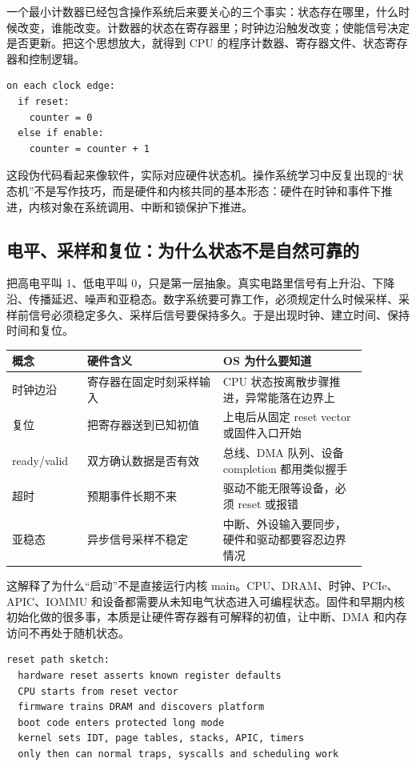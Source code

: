 一个最小计数器已经包含操作系统后来要关心的三个事实：状态存在哪里，什么时候改变，谁能改变。计数器的状态在寄存器里；时钟边沿触发改变；使能信号决定是否更新。把这个思想放大，就得到 CPU 的程序计数器、寄存器文件、状态寄存器和控制逻辑。

\begin{lstlisting}
on each clock edge:
  if reset:
    counter = 0
  else if enable:
    counter = counter + 1
\end{lstlisting}

这段伪代码看起来像软件，实际对应硬件状态机。操作系统学习中反复出现的“状态机”不是写作技巧，而是硬件和内核共同的基本形态：硬件在时钟和事件下推进，内核对象在系统调用、中断和锁保护下推进。

\subsection{电平、采样和复位：为什么状态不是自然可靠的}

把高电平叫 1、低电平叫 0，只是第一层抽象。真实电路里信号有上升沿、下降沿、传播延迟、噪声和亚稳态。数字系统要可靠工作，必须规定什么时候采样、采样前信号必须稳定多久、采样后信号要保持多久。于是出现时钟、建立时间、保持时间和复位。

\begin{longtable}{p{0.18\linewidth}p{0.34\linewidth}p{0.36\linewidth}}
\toprule
概念 & 硬件含义 & OS 为什么要知道 \\
\midrule
时钟边沿 & 寄存器在固定时刻采样输入 & CPU 状态按离散步骤推进，异常能落在边界上 \\
复位 & 把寄存器送到已知初值 & 上电后从固定 reset vector 或固件入口开始 \\
ready/valid & 双方确认数据是否有效 & 总线、DMA 队列、设备 completion 都用类似握手 \\
超时 & 预期事件长期不来 & 驱动不能无限等设备，必须 reset 或报错 \\
亚稳态 & 异步信号采样不稳定 & 中断、外设输入要同步，硬件和驱动都要容忍边界情况 \\
\bottomrule
\end{longtable}

这解释了为什么“启动”不是直接运行内核 main。CPU、DRAM、时钟、PCIe、APIC、IOMMU 和设备都需要从未知电气状态进入可编程状态。固件和早期内核初始化做的很多事，本质是让硬件寄存器有可解释的初值，让中断、DMA 和内存访问不再处于随机状态。

\begin{lstlisting}
reset path sketch:
  hardware reset asserts known register defaults
  CPU starts from reset vector
  firmware trains DRAM and discovers platform
  boot code enters protected long mode
  kernel sets IDT, page tables, stacks, APIC, timers
  only then can normal traps, syscalls and scheduling work
\end{lstlisting}

